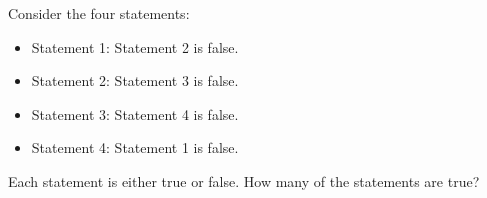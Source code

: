 Consider the four statements:
\begin{itemize}
\item Statement 1: Statement 2 is false.
\item Statement 2: Statement 3 is false.
\item Statement 3: Statement 4 is false.
\item Statement 4: Statement 1 is false.
\end{itemize}
Each statement is either true or false. How many of the statements are true?
